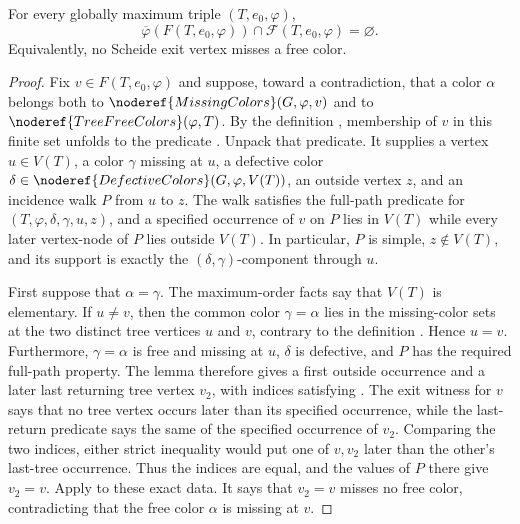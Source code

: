 \begin{lemma}
For every globally maximum triple $(T,e_0,\varphi)$,
\[
 \overline\varphi(F(T,e_0,\varphi))
 \cap\mathcal F(T,e_0,\varphi)=\varnothing.
\]
Equivalently, no Scheide exit vertex misses a free color.
\end{lemma}
\begin{proof}
Fix $v\in F(T,e_0,\varphi)$ and suppose, toward a contradiction, that a
color $\alpha$ belongs both to
$\noderef{MissingColors}(G,\varphi,v)$ and to
$\noderef{TreeFreeColors}(\varphi,T)$.  By the definition
, membership of $v$ in this finite set
unfolds to the predicate .  Unpack that
predicate.  It supplies a vertex $u\in V(T)$, a color $\gamma$ missing at
$u$, a defective color
$\delta\in\noderef{DefectiveColors}(G,\varphi,V(T))$, an outside vertex
$z$, and an incidence walk $P$ from $u$ to $z$.  The walk satisfies the
full-path predicate  for
$(T,\varphi,\delta,\gamma,u,z)$, and a specified occurrence of $v$ on
$P$ lies in $V(T)$ while every later vertex-node of $P$ lies outside
$V(T)$.  In particular, $P$ is simple, $z\notin V(T)$, and its support is
exactly the $(\delta,\gamma)$-component through $u$.

First suppose that $\alpha=\gamma$.  The maximum-order facts
 say that $V(T)$ is elementary.  If
$u\ne v$, then the common color $\gamma=\alpha$ lies in the missing-color
sets at the two distinct tree vertices $u$ and $v$, contrary to the
definition .  Hence $u=v$.
Furthermore, $\gamma=\alpha$ is free and missing at $u$, $\delta$ is
defective, and $P$ has the required full-path property.  The lemma
 therefore gives a first
outside occurrence and a later last returning tree vertex $v_2$, with
indices satisfying .  The exit witness
for $v$ says that no tree vertex occurs later than its specified
occurrence, while the last-return predicate says the same of the
specified occurrence of $v_2$.  Comparing the two indices, either strict
inequality would put one of $v,v_2$ later than the other's last-tree
occurrence.  Thus the indices are equal, and the values of $P$ there give
$v_2=v$.  Apply
 to these exact data.  It
says that $v_2=v$ misses no free color, contradicting that the free color
$\alpha$ is missing at $v$.


\end{proof}
